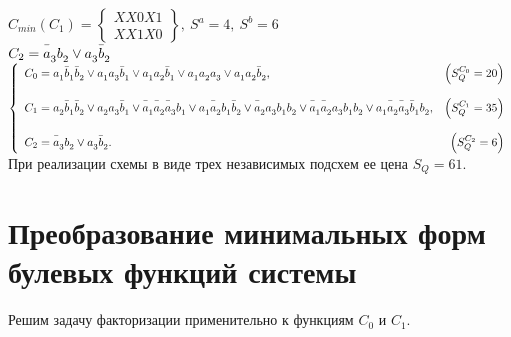 \documentclass[a4paper, 12pt]{article}
\begin{document}
$C_{min}(C_1)=\left\lbrace
\begin{array}{c}
	XX0X1\\
	XX1X0
\end{array}\right\rbrace,\
S^a=4,\ S^b=6$\\

$C_2=\bar{\mathstrut a}_3{\mathstrut b}_2\vee
{\mathstrut a}_3\bar{\mathstrut b}_2$\\

$\left\lbrace\begin{array}{l r}
	C_0={\mathstrut a}_1\bar{\mathstrut b}_1\bar{\mathstrut b}_2\vee 
	{\mathstrut a}_1{\mathstrut a}_3\bar{\mathstrut b}_1\vee
	{\mathstrut a}_1{\mathstrut a}_2\bar{\mathstrut b}_1\vee
	{\mathstrut a}_1{\mathstrut a}_2{\mathstrut a}_3\vee
	{\mathstrut a}_1{\mathstrut a}_2\bar{\mathstrut b}_2, &
	\left(S_Q^{C_0}=20\right)\\\\
	
	C_1={\mathstrut a}_2\bar{\mathstrut b}_1\bar{\mathstrut b}_2\vee
	{\mathstrut a}_2{\mathstrut a}_3\bar{\mathstrut b}_1\vee
	\bar{\mathstrut a}_1\bar{\mathstrut a}_2\bar{\mathstrut a}_3{\mathstrut b}_1\vee
	{\mathstrut a}_1\bar{\mathstrut a}_2{\mathstrut b}_1\bar{\mathstrut b}_2\vee
	\bar{\mathstrut a}_2{\mathstrut a}_3{\mathstrut b}_1{\mathstrut b}_2\vee
	\bar{\mathstrut a}_1\bar{\mathstrut a}_2{\mathstrut a}_3{\mathstrut b}_1{\mathstrut b}_2\vee
	{\mathstrut a}_1\bar{\mathstrut a}_2\bar{\mathstrut a}_3\bar{\mathstrut b}_1{\mathstrut b}_2, &
	\left(S_Q^{C_1}=35\right)\\\\
	
	C_2=\bar{\mathstrut a}_3{\mathstrut b}_2\vee
	{\mathstrut a}_3\bar{\mathstrut b}_2. &
	\left(S_Q^{C_2}=6\right)
\end{array}\right.$\\

При реализации схемы в виде трех независимых подсхем ее цена $S_Q=61$.
\section{Преобразование минимальных форм булевых функций системы}

Решим задачу факторизации применительно к функциям $C_0$ и $C_1$.\\
\end{document}
